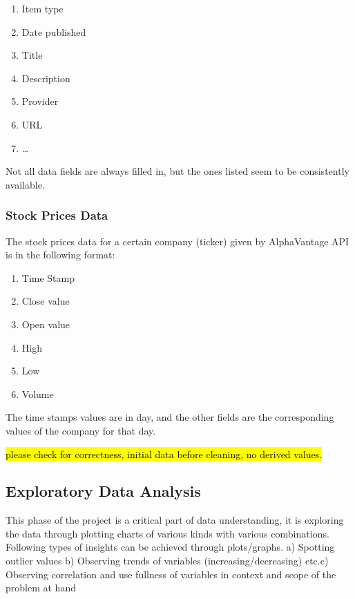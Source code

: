 \documentclass[sigconf, nonacm]{acmart}
\begin{document}
\begin{enumerate}
    \item Item type
    \item Date published
    \item Title
    \item Description
    \item Provider
    \item URL
    \item \dots
\end{enumerate}

Not all data fields are always filled in, but the ones listed seem to be consistently available.

\subsubsection{Stock Prices Data}
The stock prices data for a certain company (ticker) given by AlphaVantage API is in the following format:

\begin{enumerate}
    \item Time Stamp
    \item Close value
    \item Open value
    \item High
    \item Low
    \item Volume
\end{enumerate}

The time stamps values are in day, and the other fields are the corresponding values of the company for that day.

\hl{please check for correctness, initial data before cleaning, no derived values.}

\subsection{Exploratory Data Analysis} %
This phase of the project is a critical part of data understanding, it is exploring the data through plotting charts of various kinds with various combinations. Following types of insights can be achieved through plots/graphs. a) Spotting outlier values b)
Observing trends of variables (increasing/decreasing) etc.c) Observing correlation and use fullness of variables  in context and scope of the problem at hand
\end{document}
